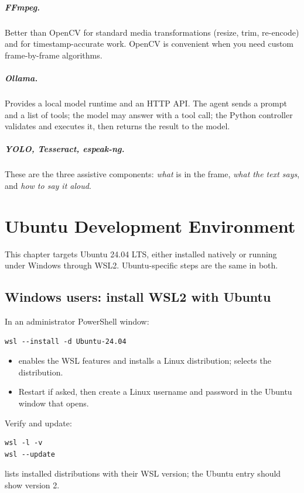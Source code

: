 \paragraph{FFmpeg.} Better than OpenCV for standard media transformations (resize, trim, re-encode) and for timestamp-accurate work.
OpenCV is convenient when you need custom frame-by-frame algorithms.

\paragraph{Ollama.} Provides a local model runtime and an HTTP API. The agent sends a prompt and a list of tools; the model may answer with a
tool call; the Python controller validates and executes it, then returns the result to the model.

\paragraph{YOLO, Tesseract, espeak-ng.} These are the three assistive components: \emph{what} is in the frame, \emph{what the text says}, and \emph{how to say it aloud}.

\chapter{Ubuntu Development Environment}
This chapter targets Ubuntu 24.04 LTS, either installed natively or running under Windows through WSL2. Ubuntu-specific steps are the same in both.

\section{Windows users: install WSL2 with Ubuntu}
In an administrator PowerShell window:
\begin{lstlisting}[style=sh]
wsl --install -d Ubuntu-24.04
\end{lstlisting}
\begin{itemize}
  \item {} enables the WSL features and installs a Linux distribution;  selects the distribution.
  \item Restart if asked, then create a Linux username and password in the Ubuntu window that opens.
\end{itemize}
Verify and update:
\begin{lstlisting}[style=sh]
wsl -l -v
wsl --update
\end{lstlisting}
 lists installed distributions with their WSL version; the Ubuntu entry should show version 2.

